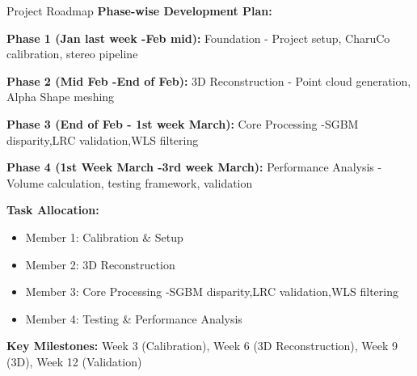 \documentclass[aspectratio=169]{beamer}
\begin{document}
\begin{frame}{Project Roadmap}
\textbf{Phase-wise Development Plan:}

\textbf{Phase 1 (Jan last week -Feb mid):} Foundation - Project setup, CharuCo calibration, stereo pipeline

\textbf{Phase 2 (Mid Feb -End of Feb):} 3D Reconstruction - Point cloud generation, Alpha Shape meshing

\textbf{Phase 3 (End of Feb - 1st week March):} Core Processing -SGBM disparity,LRC validation,WLS filtering 

\textbf{Phase 4 (1st Week March -3rd week March):} Performance Analysis - Volume calculation, testing framework, validation

\vspace{0.5cm}

\textbf{Task Allocation:}
\begin{itemize}
\item Member 1: Calibration \& Setup
\item Member 2: 3D Reconstruction
\item Member 3: Core Processing -SGBM disparity,LRC validation,WLS filtering 
\item Member 4: Testing \& Performance Analysis
\end{itemize}

\vspace{0.5cm}

\textbf{Key Milestones:} Week 3 (Calibration), Week 6 (3D Reconstruction), Week 9 (3D), Week 12 (Validation)
\end{frame}
\end{document}
